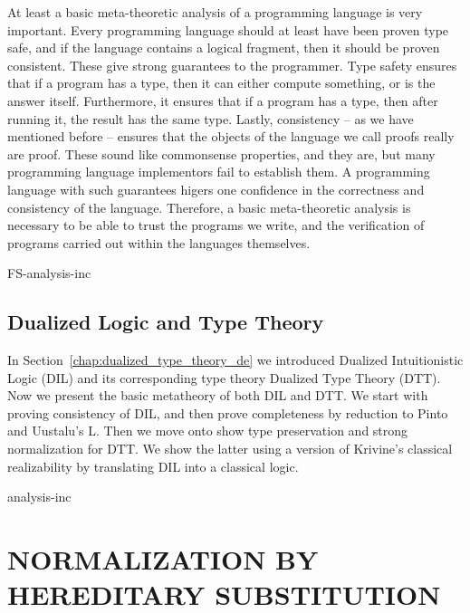 \documentclass[phd,appendix,dedicationpage,ackpage,epigraphpage,figures]{uithesis}
\begin{document}
At least a basic meta-theoretic analysis of a programming language is
very important.  Every programming language should at least have been
proven type safe, and if the language contains a
logical fragment, then it should be proven consistent.  These give
strong guarantees to the programmer.  Type safety ensures that if a
program has a type, then it can either compute something, or is the
answer itself.  Furthermore, it ensures that if a program has a type,
then after running it, the result has the same type.  Lastly,
consistency -- as we have mentioned before --
ensures that the objects of the language we call proofs really are
proof.  These sound like commonsense properties, and they are, but
many programming language implementors fail to establish them.  A
programming language with such guarantees higers one confidence in the
correctness and consistency of the language.  Therefore, a basic
meta-theoretic analysis is necessary to be able to trust the programs
we write, and the verification of programs carried out within the
languages themselves.

{FS-analysis-inc}

\chapter{Dualized Logic and Type Theory}
\label{chap:dualized_type_theory_anal}

In Section~\ref{chap:dualized_type_theory_de} we introduced Dualized
Intuitionistic Logic (DIL) and its corresponding type theory Dualized
Type Theory (DTT).  Now we present the basic metatheory of both DIL
and DTT.  We start with proving consistency of DIL, and then prove
completeness by reduction to Pinto and Uustalu's L. Then we move onto
show type preservation and strong normalization for DTT.  We show the
latter using a version of Krivine's classical realizability by
translating DIL into a classical logic.

{analysis-inc}

\part{NORMALIZATION BY HEREDITARY SUBSTITUTION}
\label{part:norm-hs}
\end{document}
